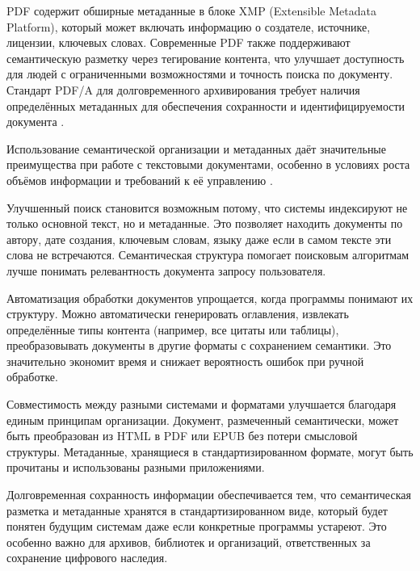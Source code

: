 \documentclass{SibFU-docs}
\begin{document}
PDF содержит обширные метаданные в блоке XMP (Extensible Metadata Platform), который может включать информацию о создателе, источнике, лицензии, ключевых словах. Современные PDF также поддерживают семантическую разметку через тегирование контента, что улучшает доступность для людей с ограниченными возможностями и точность поиска по документу. Стандарт PDF/A для долговременного архивирования требует наличия определённых метаданных для обеспечения сохранности и идентифицируемости документа \cite{pdf_xmp, iso32000}.


Использование семантической организации и метаданных даёт значительные преимущества при работе с текстовыми документами, особенно в условиях роста объёмов информации и требований к её управлению \cite{gilliland2016metadata, dublincore}.

Улучшенный поиск становится возможным потому, что системы индексируют не только основной текст, но и метаданные. Это позволяет находить документы по автору, дате создания, ключевым словам, языку даже если в самом тексте эти слова не встречаются. Семантическая структура помогает поисковым алгоритмам лучше понимать релевантность документа запросу пользователя.

Автоматизация обработки документов упрощается, когда программы понимают их структуру. Можно автоматически генерировать оглавления, извлекать определённые типы контента (например, все цитаты или таблицы), преобразовывать документы в другие форматы с сохранением семантики. Это значительно экономит время и снижает вероятность ошибок при ручной обработке.

Совместимость между разными системами и форматами улучшается благодаря единым принципам организации. Документ, размеченный семантически, может быть преобразован из HTML в PDF или EPUB без потери смысловой структуры. Метаданные, хранящиеся в стандартизированном формате, могут быть прочитаны и использованы разными приложениями.

Долговременная сохранность информации обеспечивается тем, что семантическая разметка и метаданные хранятся в стандартизированном виде, который будет понятен будущим системам даже если конкретные программы устареют. Это особенно важно для архивов, библиотек и организаций, ответственных за сохранение цифрового наследия.

\end{document}
